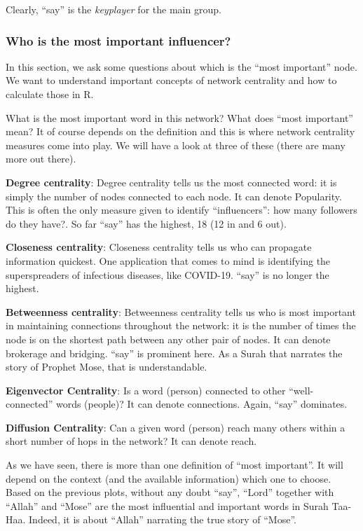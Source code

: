 \documentclass[
]{article}
\begin{document}
Clearly, ``say'' is the \emph{keyplayer} for the main group.

\hypertarget{who-is-the-most-important-influencer}{%
\subsubsection{Who is the most important influencer?}\label{who-is-the-most-important-influencer}}

In this section, we ask some questions about which is the ``most important'' node. We want to understand important concepts of network centrality and how to calculate those in R.

What is the most important word in this network? What does ``most important'' mean? It of course depends on the definition and this is where network centrality measures come into play. We will have a look at three of these (there are many more out there).

\textbf{Degree centrality}: Degree centrality tells us the most connected word: it is simply the number of nodes connected to each node. It can denote Popularity. This is often the only measure given to identify ``influencers'': how many followers do they have?. So far ``say'' has the highest, 18 (12 in and 6 out).

\textbf{Closeness centrality}: Closeness centrality tells us who can propagate information quickest. One application that comes to mind is identifying the superspreaders of infectious diseases, like COVID-19. ``say'' is no longer the highest.

\textbf{Betweenness centrality}: Betweenness centrality tells us who is most important in maintaining connections throughout the network: it is the number of times the node is on the shortest path between any other pair of nodes. It can denote brokerage and bridging. ``say'' is prominent here. As a Surah that narrates the story of Prophet Mose, that is understandable.

\textbf{Eigenvector Centrality}: Is a word (person) connected to other ``well-connected'' words (people)? It can denote connections. Again, ``say'' dominates.

\textbf{Diffusion Centrality}: Can a given word (person) reach many others within a short number of hops in the network? It can denote reach.

As we have seen, there is more than one definition of ``most important''. It will depend on the context (and the available information) which one to choose. Based on the previous plots, without any doubt ``say'', ``Lord'' together with ``Allah'' and ``Mose'' are the most influential and important words in Surah Taa-Haa. Indeed, it is about ``Allah'' narrating the true story of ``Mose''.
\end{document}

